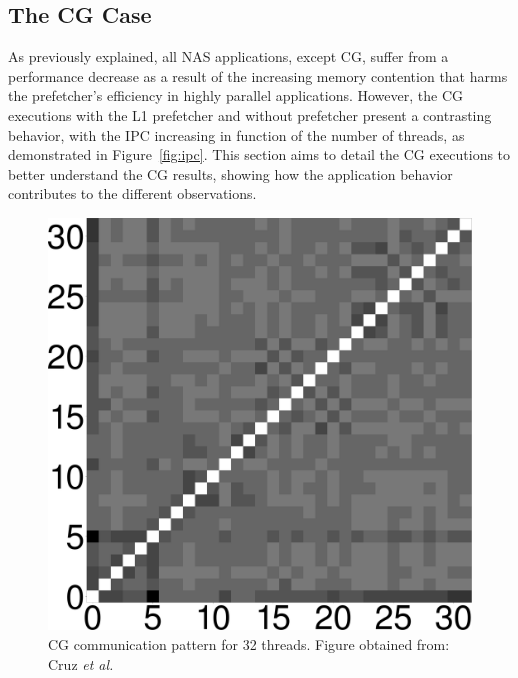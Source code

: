 \documentclass[AMA,final,STIX1COL]{WileyNJD-v2}
\newcommand{\fbm}[1]{\textcolor{red}{\bfseries \ul{fbm: #1} }\vspace{0.2cm}}
\begin{document}
\subsection{The CG Case}\label{subs:cg}


As previously explained, all NAS applications, except CG, suffer from a performance decrease as a result of the increasing memory contention that harms the prefetcher's efficiency in highly parallel applications.
However, the CG executions with the L1 prefetcher and without prefetcher present a contrasting behavior, with the IPC increasing in function of the number of threads, as demonstrated in Figure~\ref{fig:ipc}.
This section aims to detail the CG executions to better understand the CG results, showing how the application behavior contributes to the different observations. %


\begin{figure}[!htb]
    \centering
    \includegraphics[width=.3\linewidth]{figures/cg.pdf}
    \caption{CG communication pattern for 32 threads. Figure obtained from: Cruz \textit{et al.}~\cite{cruz2018thread}}
    \label{fig:figcomma}
\end{figure}
\end{document}
